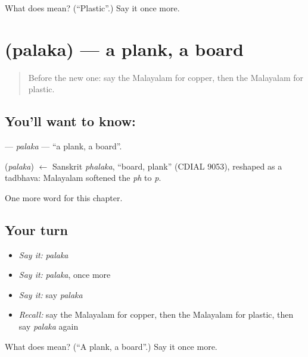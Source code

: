 \begin{tcolorbox}[breakable,colback=teal!4,colframe=teal!35!black,title={Before you move on}]
What does  mean? (\textquotedblleft{}Plastic\textquotedblright{}.) Say it once more.
\end{tcolorbox}
\section[\texorpdfstring{\ml{പലക} (palaka)}{പലക (palaka)}]{ (palaka) — a plank, a board}

\label{lesson:ML-C216-palaka}



\begin{quote}
Before the new one: say the Malayalam for copper, then the Malayalam for plastic.
\end{quote}

\subsection*{You'll want to know: }
\textbf{} — \emph{palaka} — \textquotedblleft{}a plank, a board\textquotedblright{}.

\begin{cousinweb}
\textbf{} (\emph{palaka}) $\leftarrow$ Sanskrit \emph{phalaka}, \textquotedblleft{}board, plank\textquotedblright{} (CDIAL 9053), reshaped as a tadbhava: Malayalam softened the \emph{ph} to \emph{p}.
\end{cousinweb}

\begin{grammarlens}[title={What you've built}]
One more word for this chapter.
\end{grammarlens}

\subsection*{Your turn}
\begin{itemize}
\raggedright
  \item \emph{Say it:} \emph{palaka}
  \item \emph{Say it:} \emph{palaka}, once more
  \item \emph{Say it:} say \emph{palaka}
  \item \emph{Recall:} say the Malayalam for copper, then the Malayalam for plastic, then say \emph{palaka} again
\end{itemize}

\begin{tcolorbox}[breakable,colback=teal!4,colframe=teal!35!black,title={Before you move on}]
What does  mean? (\textquotedblleft{}A plank, a board\textquotedblright{}.) Say it once more.
\end{tcolorbox}
